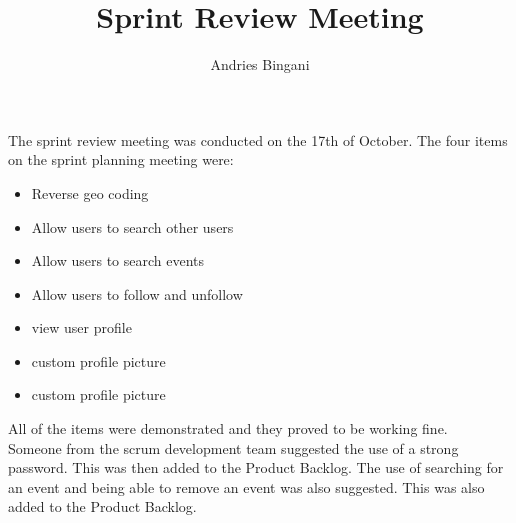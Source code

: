 \documentclass[10pt,a4paper]{article}
\author{Andries Bingani}
\title{Sprint Review Meeting}
\begin{document}
\maketitle

The sprint review meeting was conducted on the 17th of October. The four items on the sprint planning meeting were: \\
\begin{itemize}
\item Reverse geo coding
\item Allow users to search other users
\item Allow users to search events
\item Allow users to follow and unfollow
\item view user profile
\item custom profile picture
\item custom profile picture
\end{itemize}

All of the items were demonstrated and they proved to be working fine. 
\\
Someone from the scrum development team suggested the use of a strong password. This was then added to the Product Backlog. The use of searching for an event and being able to remove an event was also suggested. This was also added to the Product Backlog. 
\end{document}
